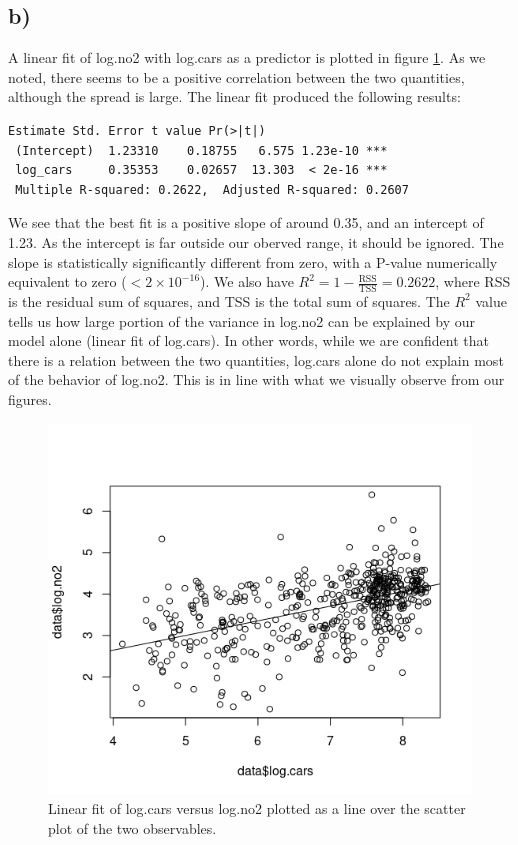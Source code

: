 \documentclass[a4paper, twocolumn]{article}
\begin{document}
\subsection*{b)}
A linear fit of log.no2 with log.cars as a predictor is plotted in figure \ref{fig:no2_cars_vs_no2_linfit}. As we noted, there seems to be a positive correlation between the two quantities, although the spread is large. The linear fit produced the following results:
\begin{Verbatim}[fontsize=\small]
 Estimate Std. Error t value Pr(>|t|)    
 (Intercept)  1.23310    0.18755   6.575 1.23e-10 ***
 log_cars     0.35353    0.02657  13.303  < 2e-16 ***
 Multiple R-squared: 0.2622,  Adjusted R-squared: 0.2607 
\end{Verbatim}
We see that the best fit is a positive slope of around 0.35, and an intercept of 1.23. As the intercept is far outside our oberved range, it should be ignored. The slope is statistically significantly different from zero, with a P-value numerically equivalent to zero ($<2\times 10^{-16}$). We also have $R^2 = 1 - \frac{\mathrm{RSS}}{\mathrm{TSS}} = 0.2622$, where RSS is the residual sum of squares, and TSS is the total sum of squares. The $R^2$ value tells us how large portion of the variance in log.no2 can be explained by our model alone (linear fit of log.cars). In other words, while we are confident that there is a relation between the two quantities, log.cars alone do not explain most of the behavior of log.no2. This is in line with what we visually observe from our figures.

\begin{figure}
    \centering
    \includegraphics[width=0.8\linewidth]{figures/no2_cars_vs_no2_linfit.png}
    \caption{Linear fit of log.cars versus log.no2 plotted as a line over the scatter plot of the two observables.}
    \label{fig:no2_cars_vs_no2_linfit}
\end{figure}
\end{document}
